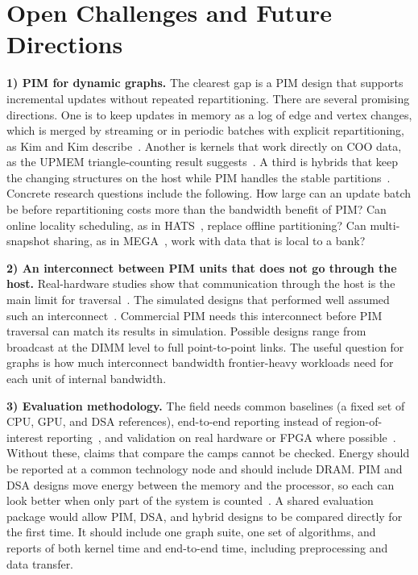 \documentclass[journal,onecolumn]{IEEEtran}
\begin{document}
\section{Open Challenges and Future Directions}\label{sec:open}
\textbf{1) PIM for dynamic graphs.} The clearest gap is a PIM design that supports incremental updates without repeated repartitioning. There are several promising directions. One is to keep updates in memory as a log of edge and vertex changes, which is merged by streaming or in periodic batches with explicit repartitioning, as Kim and Kim describe~\cite{kim2020dynamic}. Another is kernels that work directly on COO data, as the UPMEM triangle-counting result suggests~\cite{asquini2025tc}. A third is hybrids that keep the changing structures on the host while PIM handles the stable partitions~\cite{shin2025fala}. Concrete research questions include the following. How large can an update batch be before repartitioning costs more than the bandwidth benefit of PIM? Can online locality scheduling, as in HATS~\cite{mukkara2018hats}, replace offline partitioning? Can multi-snapshot sharing, as in MEGA~\cite{gao2023mega}, work with data that is local to a bank?

\textbf{2) An interconnect between PIM units that does not go through the host.} Real-hardware studies show that communication through the host is the main limit for traversal~\cite{gomezluna2022prim,barkhordar2025alphapim}. The simulated designs that performed well assumed such an interconnect~\cite{ahn2015tesseract,zhuo2019graphq}. Commercial PIM needs this interconnect before PIM traversal can match its results in simulation. Possible designs range from broadcast at the DIMM level to full point-to-point links. The useful question for graphs is how much interconnect bandwidth frontier-heavy workloads need for each unit of internal bandwidth.

\textbf{3) Evaluation methodology.} The field needs common baselines (a fixed set of CPU, GPU, and DSA references), end-to-end reporting instead of region-of-interest reporting~\cite{yenimol2026cograf}, and validation on real hardware or FPGA where possible~\cite{shin2025piccolo,chen2022regraph}. Without these, claims that compare the camps cannot be checked. Energy should be reported at a common technology node and should include DRAM. PIM and DSA designs move energy between the memory and the processor, so each can look better when only part of the system is counted~\cite{yenimol2026cograf,ham2016graphicionado}. A shared evaluation package would allow PIM, DSA, and hybrid designs to be compared directly for the first time. It should include one graph suite, one set of algorithms, and reports of both kernel time and end-to-end time, including preprocessing and data transfer.
\end{document}

